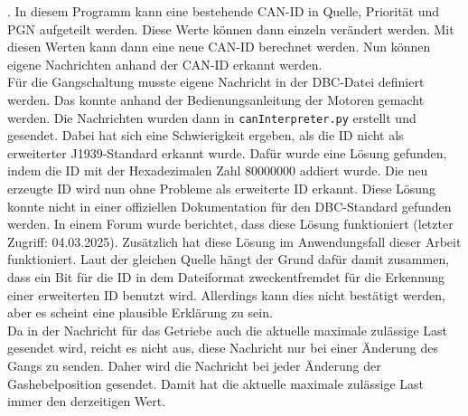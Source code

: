 \cite{canboatjs}. 
In diesem Programm kann eine bestehende CAN-ID in Quelle, Priorität und PGN aufgeteilt werden. Diese Werte können dann
einzeln verändert werden. Mit diesen Werten kann dann eine neue CAN-ID berechnet werden. Nun können eigene Nachrichten 
anhand der CAN-ID erkannt werden.\\
Für die Gangschaltung musste eigene Nachricht in der DBC-Datei definiert werden. Das konnte anhand der Bedienungsanleitung
der Motoren gemacht werden. Die Nachrichten wurden dann in \texttt{canInterpreter.py} erstellt und gesendet.
Dabei hat sich eine Schwierigkeit ergeben, als die ID nicht als erweiterter J1939-Standard erkannt wurde. 
Dafür wurde eine Lösung gefunden, indem die ID mit der Hexadezimalen Zahl 80000000 addiert wurde. Die neu erzeugte ID
wird nun ohne Probleme als erweiterte ID erkannt. Diese Lösung konnte nicht in einer offiziellen Dokumentation für den
DBC-Standard gefunden werden. In einem Forum wurde berichtet, dass diese Lösung funktioniert \cite{cantoolsIssue} (letzter Zugriff: 04.03.2025). 
Zusätzlich hat diese Lösung im Anwendungsfall dieser Arbeit funktioniert. 
Laut der gleichen Quelle hängt der Grund dafür damit zusammen, dass ein Bit für die ID in dem Dateiformat zweckentfremdet für
die Erkennung einer erweiterten ID benutzt wird. Allerdings kann dies nicht bestätigt werden, aber es scheint eine plausible
Erklärung zu sein. \\
Da in der Nachricht für das Getriebe auch die aktuelle maximale zulässige Last gesendet wird, reicht es nicht aus, diese
Nachricht nur bei einer Änderung des Gangs zu senden. Daher wird die Nachricht bei jeder Änderung der Gashebelposition
gesendet. Damit hat die aktuelle maximale zulässige Last immer den derzeitigen Wert.